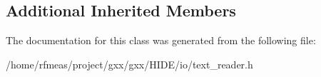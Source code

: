 \subsection*{Additional Inherited Members}


The documentation for this class was generated from the following file\+:\begin{DoxyCompactItemize}
\item 
/home/rfmeas/project/gxx/gxx/\+H\+I\+D\+E/io/text\+\_\+reader.\+h\end{DoxyCompactItemize}
